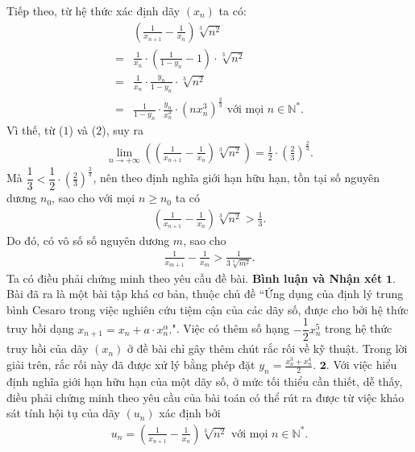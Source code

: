 \begin{multicols}{2}
	\vskip 0.05cm
	Tiếp theo, từ hệ thức xác định dãy $(x_n)$  ta có:
	\begin{align*}
		&\left( {\frac{1}{{{x_{n + 1}}}} - \frac{1}{{{x_n}}}} \right)\sqrt[3]{{{n^2}}}\\
		= &\frac{1}{{{x_n}}} \cdot \left( {\frac{1}{{1 - {y_n}}} - 1} \right) \cdot \sqrt[3]{{{n^2}}} \\
		= &\frac{1}{{{x_n}}} \cdot \frac{{{y_n}}}{{1 - {y_n}}} \cdot \sqrt[3]{{{n^2}}} \\
		= &\frac{1}{{1 - {y_n}}} \cdot \frac{{{y_n}}}{{x_n^3}} \cdot {\left( {nx_n^3} \right)^{\frac{2}{3}}} \text{ với mọi } n\in \mathbb{N^*}.
	\end{align*}  
	Vì thế, từ ($1$) và ($2$), suy ra
	\begin{align*}
		\mathop {\lim }\limits_{n \to +\infty } \left( {\left( {\frac{1}{{{x_{n + 1}}}} - \frac{1}{{{x_n}}}} \right)\sqrt[3]{{{n^2}}}} \right) = \frac{1}{2} \cdot {\left( {\frac{2}{3}} \right)^{\frac{2}{3}}}.
	\end{align*}
	Mà  $\dfrac{1}{3} < \dfrac{1}{2} \cdot {\left( {\frac{2}{3}} \right)^{\frac{2}{3}}}$, nên theo định nghĩa giới hạn hữu hạn, tồn tại số nguyên dương  $n_0$, sao cho với mọi $n \ge n_0$  ta có
	\begin{align*}
		\left( {\frac{1}{{{x_{n + 1}}}} - \frac{1}{{{x_n}}}} \right)\sqrt[3]{{{n^2}}} > \frac{1}{3}.
	\end{align*}
	Do đó, có vô số số nguyên dương $m$, sao cho
	\begin{align*}
		\frac{1}{{{x_{m + 1}}}} - \frac{1}{{{x_m}}} > \frac{1}{{3\sqrt[3]{{{m^2}}}}}.
	\end{align*}
	Ta có điều phải chứng minh theo yêu cầu đề bài.
	\vskip 0.05cm
	\textbf{\color{thachthuctoanhoc}Bình luận và Nhận xét}
	\vskip 0.05cm
	$\pmb{1.}$ Bài đã ra là một bài tập khá cơ bản, thuộc chủ đề ``Ứng dụng của định lý trung bình Cesaro trong việc nghiên cứu tiệm cận của các dãy số, được cho bởi hệ thức truy hồi dạng ${x_{n + 1}} = {x_n} + a \cdot x_n^\alpha .$". Việc có thêm số hạng $-\dfrac{1}{2}x_n^5$ trong hệ thức truy hồi của dãy $(x_n)$  ở đề bài chỉ gây thêm chút rắc rối về kỹ thuật. Trong lời giải trên, rắc rối này đã được xử lý bằng phép đặt  ${y_n} = \frac{{x_n^3 + x_n^4}}{2}$.
	\vskip 0.05cm
	$\pmb{2.}$ Với việc hiểu định nghĩa giới hạn hữu hạn của một dãy số, ở mức tối thiểu cần thiết, dễ thấy, điều phải chứng minh theo yêu cầu của bài toán có thể rút ra được từ việc khảo sát tính hội tụ của dãy $(u_n)$  xác định bởi
	\begin{align*}
		{u_n} = \left( {\frac{1}{{{x_{n + 1}}}} - \frac{1}{{{x_n}}}} \right)\sqrt[3]{{{n^2}}} \text{ với mọi } n \in \mathbb{N^*}.

\end{align*}
\end{multicols}
